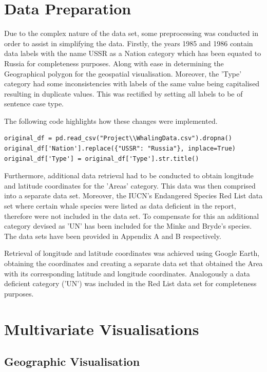 \documentclass[12pt,a4paper]{article}
\begin{document}
\newpage


\section{Data Preparation}
Due to the complex nature of the data set, some preprocessing was conducted in order to assist in simplifying the data. Firstly, the years 1985 and 1986 contain data labels with the name USSR as a Nation category which has been equated to Russia for completeness purposes. Along with ease in determining the Geographical polygon for the geospatial visualisation. Moreover, the 'Type' category had some inconsistencies with labels of the same value being capitalised resulting in duplicate values. This was rectified by setting all labels to be of sentence case type. 

The following code highlights how these changes were implemented. 

\begin{verbatim}
original_df = pd.read_csv("Project\\WhalingData.csv").dropna()
original_df['Nation'].replace({"USSR": "Russia"}, inplace=True)
original_df['Type'] = original_df['Type'].str.title()
\end{verbatim}

Furthermore, additional data retrieval had to be conducted to obtain longitude and latitude coordinates for the 'Areas' category. This data was then comprised into a separate data set. Moreover, the IUCN's Endangered Species Red List data set where certain whale species were listed as data deficient in the report, therefore were not included in the data set. To compensate for this an additional category devised as 'UN' has been included for the Minke and Bryde's species.  The data sets have been provided in Appendix A and B respectively.  

Retrieval of longitude and latitude coordinates was achieved using Google Earth, obtaining the coordinates and creating a separate data set that obtained the Area with its corresponding latitude and longitude coordinates. Analogously a data deficient category ('UN') was included in the Red List data set for completeness purposes.


\section{Multivariate Visualisations}
\subsection{Geographic Visualisation}
\end{document}
